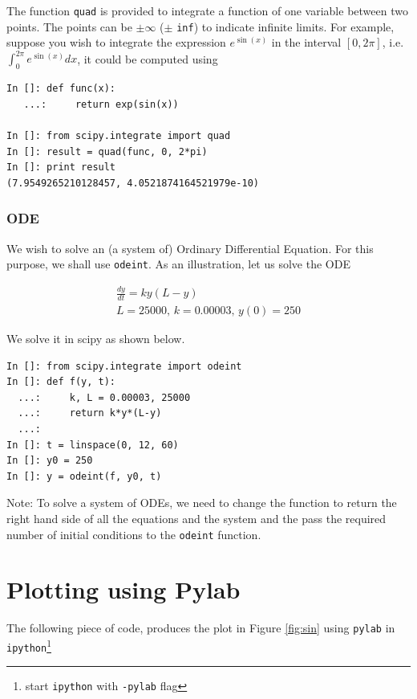 \documentclass{article}
\begin{document}
The function \texttt{quad} is provided to integrate a function of one
variable between two points. The points can be $\pm\infty$ ($\pm$
\texttt{inf}) to indicate infinite limits. For example, suppose you
wish to integrate the expression $e^{\sin(x)}$ in the interval
$[0,2\pi]$, i.e. $\int_0^{2\pi}e^{\sin(x)}dx$, it could be computed
using

\begin{lstlisting}
In []: def func(x):
   ...:     return exp(sin(x))

In []: from scipy.integrate import quad
In []: result = quad(func, 0, 2*pi)
In []: print result
(7.9549265210128457, 4.0521874164521979e-10)
\end{lstlisting}

\subsubsection{ODE}

We wish to solve an (a system of) Ordinary Differential Equation. For
this purpose, we shall use \lstinline{odeint}. As an illustration, let
us solve the ODE 

\begin{align} 
  \frac{dy}{dt} = ky(L-y)\\ 
  L = 25000,\,k = 0.00003,\,y(0) = 250 \nonumber 
\end{align}

We solve it in scipy as shown below. 

\begin{lstlisting}
In []: from scipy.integrate import odeint
In []: def f(y, t):
  ...:     k, L = 0.00003, 25000
  ...:     return k*y*(L-y)
  ...:
In []: t = linspace(0, 12, 60)
In []: y0 = 250
In []: y = odeint(f, y0, t)
\end{lstlisting}

Note: To solve a system of ODEs, we need to change the function to
return the right hand side of all the equations and the system and the
pass the required number of initial conditions to the
\lstinline{odeint} function.

\appendix

\section{Plotting using Pylab}\label{mpl}

The following piece of code, produces the plot in Figure \ref{fig:sin}
using \texttt{pylab}\cite{pylab} in \texttt{ipython}\footnote{start
  \texttt{ipython} with \texttt{-pylab} flag}\cite{ipy}
\end{document}
